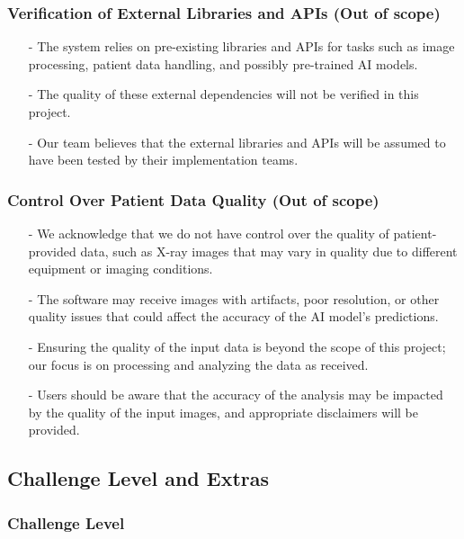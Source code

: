 \documentclass[12pt, titlepage]{article}
\begin{document}
    \subsubsection{Verification of External Libraries and APIs (Out of scope)}
    \begin{itemize}
        \item[-] The system relies on pre-existing libraries and APIs for tasks such as image processing, patient data handling, and possibly pre-trained AI models.
        \item[-] The quality of these external dependencies will not be verified in this project.
        \item[-] Our team believes that the external libraries and APIs will be assumed to have been tested by their implementation teams.
    \end{itemize}
    
    \subsubsection{Control Over Patient Data Quality (Out of scope)}
    \begin{itemize}
        \item[-] We acknowledge that we do not have control over the quality of patient-provided data, such as X-ray images that may vary in quality due to different equipment or imaging conditions.
        \item[-] The software may receive images with artifacts, poor resolution, or other quality issues that could affect the accuracy of the AI model's predictions.
        \item[-] Ensuring the quality of the input data is beyond the scope of this project; our focus is on processing and analyzing the data as received.
        \item[-] Users should be aware that the accuracy of the analysis may be impacted by the quality of the input images, and appropriate disclaimers will be provided.
    \end{itemize}

\subsection{Challenge Level and Extras}

\subsubsection{Challenge Level}
\end{document}
